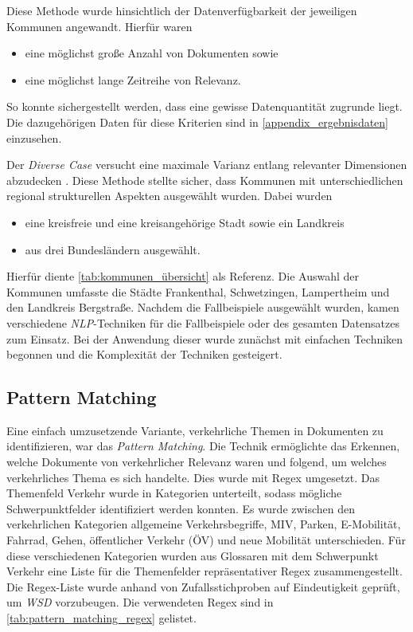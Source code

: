 Diese Methode wurde hinsichtlich der Datenverfügbarkeit der jeweiligen Kommunen angewandt. Hierfür waren
\begin{itemize}
    \item eine möglichst große Anzahl von Dokumenten sowie
    \item eine möglichst lange Zeitreihe von Relevanz.
\end{itemize}
So konnte sichergestellt werden, dass eine gewisse Datenquantität zugrunde liegt. Die dazugehörigen Daten für diese Kriterien sind in \autoref{appendix_ergebnisdaten} einzusehen.

Der \textit{Diverse Case} versucht eine maximale Varianz entlang relevanter Dimensionen abzudecken \parencite[vgl.][8]{gerring2009}. Diese Methode stellte sicher, dass Kommunen mit unterschiedlichen regional strukturellen Aspekten ausgewählt wurden. Dabei wurden
\begin{itemize}
    \item eine kreisfreie und eine kreisangehörige Stadt sowie ein Landkreis
    \item aus drei Bundesländern ausgewählt.
\end{itemize}

Hierfür diente \autoref{tab:kommunen_übersicht} als Referenz. Die Auswahl der Kommunen umfasste die Städte Frankenthal, Schwetzingen, Lampertheim und den Landkreis Bergstraße. Nachdem die Fallbeispiele ausgewählt wurden, kamen verschiedene \textit{NLP}-Techniken für die Fallbeispiele oder des gesamten Datensatzes zum Einsatz. Bei der Anwendung dieser wurde zunächst mit einfachen Techniken begonnen und die Komplexität der Techniken gesteigert.



\subsection{Pattern Matching}\label{sec:pattern_matching}

Eine einfach umzusetzende Variante, verkehrliche Themen in Dokumenten zu identifizieren, war das \textit{Pattern Matching}. Die Technik ermöglichte das Erkennen, welche Dokumente von verkehrlicher Relevanz waren und folgend, um welches verkehrliches Thema es sich handelte. Dies wurde mit Regex umgesetzt. Das Themenfeld Verkehr wurde in Kategorien unterteilt, sodass mögliche Schwerpunktfelder identifiziert werden konnten. Es wurde zwischen den verkehrlichen Kategorien allgemeine Verkehrsbegriffe, MIV, Parken, E-Mobilität, Fahrrad, Gehen, öffentlicher Verkehr (ÖV) und neue Mobilität unterschieden. Für diese verschiedenen Kategorien wurden aus Glossaren mit dem Schwerpunkt Verkehr eine Liste für die Themenfelder repräsentativer Regex zusammengestellt. Die Regex-Liste wurde anhand von Zufallsstichproben auf Eindeutigkeit geprüft, um \textit{WSD} vorzubeugen. Die verwendeten Regex sind in \autoref{tab:pattern_matching_regex} gelistet.

